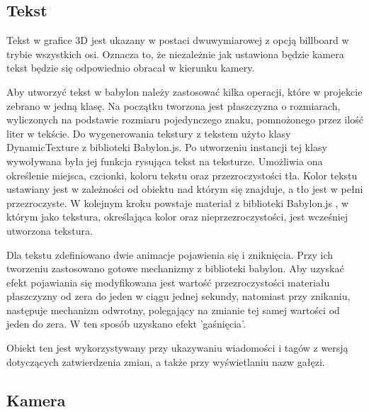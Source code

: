 \documentclass[12pt,a4paper,polish,thesis]{dcsbook}
\begin{document}
{	\subsection{Tekst}
	Tekst w grafice 3D jest ukazany w postaci dwuwymiarowej z opcją billboard w trybie  wszystkich osi. Oznacza to, że niezależnie jak ustawiona będzie kamera tekst będzie się odpowiednio obracał w kierunku kamery.

	Aby utworzyć tekst w babylon należy zastosować kilka operacji, które w projekcie zebrano w jedną klasę. Na początku tworzona jest płaszczyzna o rozmiarach, wyliczonych na podstawie rozmiaru pojedynczego znaku, pomnożonego przez ilość liter w tekście. Do wygenerowania tekstury z tekstem użyto klasy DynamicTexture z biblioteki Babylon.js. Po utworzeniu instancji tej klasy wywoływana była jej funkcja rysująca tekst na teksturze. Umożliwia ona określenie miejsca, czcionki, koloru tekstu oraz przezroczystości tła. Kolor tekstu ustawiany jest w zależności od obiektu nad którym się znajduje, a tło jest w pełni przezroczyste. W kolejnym kroku powstaje materiał z biblioteki Babylon.js , w którym jako tekstura, określająca kolor oraz nieprzezroczystości, jest wcześniej utworzona tekstura.

	Dla tekstu zdefiniowano dwie animacje pojawienia się i zniknięcia. Przy ich tworzeniu zastosowano gotowe mechanizmy z biblioteki babylon. Aby uzyskać efekt pojawiania się modyfikowana jest wartość przezroczystości materiału płaszczyzny od zera do jeden w ciągu jednej sekundy, natomiast przy znikaniu, następuje mechanizm odwrotny, polegający na zmianie tej samej wartości od jeden do zera. W ten sposób uzyskano efekt 'gaśnięcia'.

	Obiekt ten jest wykorzystywany przy ukazywaniu wiadomości i tagów z wersją dotyczących zatwierdzenia zmian, a także przy wyświetlaniu nazw gałęzi.



	\subsection{Kamera}

}
\end{document}
